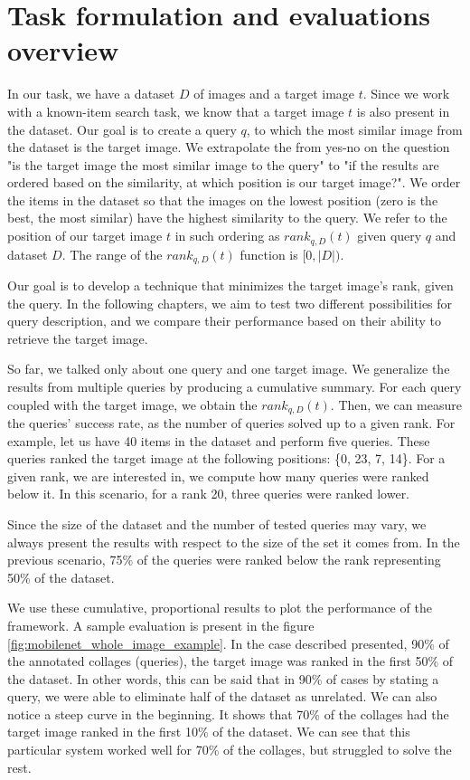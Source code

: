 \section{Task formulation and evaluations overview}

In our task, we have a dataset $D$ of images and a target image $t$. Since we work with a known-item search task, we know that a target image $t$ is also present in the dataset. Our goal is to create a query $q$, to which the most similar image from the dataset is the target image. We extrapolate the from yes-no on the question "is the target image the most similar image to the query" to "if the results are ordered based on the similarity, at which position is our target image?". We order the items in the dataset so that the images on the lowest position (zero is the best, the most similar) have the highest similarity to the query. We refer to the position of our target image $t$ in such ordering as $rank_{q,D}(t)$ given query $q$ and dataset $D$. The range of the $rank_{q,D}(t)$ function is $[0, |D|)$.

Our goal is to develop a technique that minimizes the target image's rank, given the query. In the following chapters, we aim to test two different possibilities for query description, and we compare their performance based on their ability to retrieve the target image.

So far, we talked only about one query and one target image. We generalize the results from multiple queries by producing a cumulative summary. For each query coupled with the target image, we obtain the $rank_{q, D}(t)$. Then, we can measure the queries' success rate, as the number of queries solved up to a given rank. For example, let us have 40 items in the dataset and perform five queries. These queries ranked the target image at the following positions: \{0, 23, 7, 14\}. For a given rank, we are interested in, we compute how many queries were ranked below it. In this scenario, for a rank 20, three queries were ranked lower.

Since the size of the dataset and the number of tested queries may vary, we always present the results with respect to the size of the set it comes from. In the previous scenario, 75\% of the queries were ranked below the rank representing 50\% of the dataset.

We use these cumulative, proportional results to plot the performance of the framework. A sample evaluation is present in the figure \ref{fig:mobilenet_whole_image_example}. In the case described presented, 90\% of the annotated collages (queries), the target image was ranked in the first 50\% of the dataset. In other words, this can be said that in 90\% of cases by stating a query, we were able to eliminate half of the dataset as unrelated. We can also notice a steep curve in the beginning. It shows that 70\% of the collages had the target image ranked in the first 10\% of the dataset. We can see that this particular system worked well for 70\% of the collages, but struggled to solve the rest.

